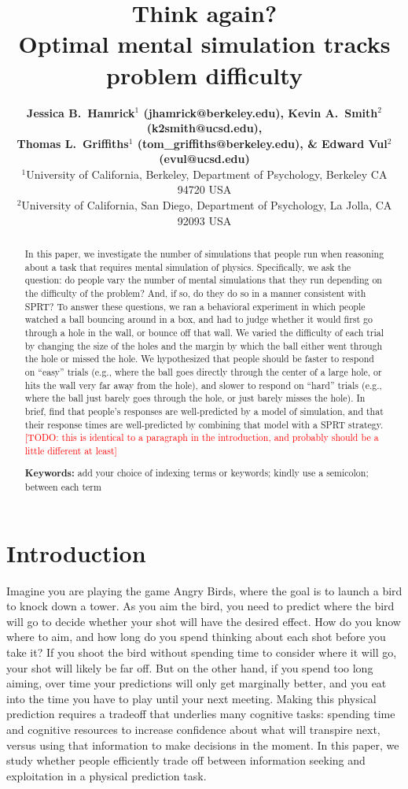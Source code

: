\documentclass[10pt,letterpaper]{article}
\title{Think again?\\ Optimal mental simulation tracks problem difficulty}
\author{{\large \bf Jessica B.~Hamrick$^1$ (jhamrick@berkeley.edu),
    Kevin A.~Smith$^2$ (k2smith@ucsd.edu),}\\
    {\large \bf Thomas L.~Griffiths$^1$ (tom\_griffiths@berkeley.edu),
      \& Edward Vul$^2$ (evul@ucsd.edu)}\\
    $^1$University of California, Berkeley, Department of Psychology, Berkeley CA 94720 USA\\
    $^2$University of California, San Diego, Department of Psychology, La Jolla, CA 92093 USA}
\newcommand{\TODO}[1]{\textcolor{red}{[TODO: #1]}}
\begin{document}
\maketitle

\begin{abstract}
In this paper, we investigate the number of simulations that people run when reasoning about a task that requires mental simulation of physics. 
Specifically, we ask the question: do people vary the number of mental simulations that they run depending on the difficulty of the problem? 
And, if so, do they do so in a manner consistent with SPRT? 
To answer these questions, we ran a behavioral experiment in which people watched a ball bouncing around in a box, and had to judge whether it would first go through a hole in the wall, or bounce off that wall. 
We varied the difficulty of each trial by changing the size of the holes and the margin by which the ball either went through the hole or missed the hole. 
We hypothesized that people should be faster to respond on ``easy'' trials (e.g., where the ball goes directly through the center of a large hole, or hits the wall very far away from the hole), and slower to respond on ``hard'' trials (e.g., where the ball just barely goes through the hole, or just barely misses the hole). 
In brief, find that people's responses are well-predicted by a model of simulation, and that their response times are well-predicted by combining that model with a SPRT strategy.
\TODO{this is identical to a paragraph in the introduction, and probably should be a little different at least}

\textbf{Keywords:} 
add your choice of indexing terms or keywords; kindly use a
semicolon; between each term
\end{abstract}

\section{Introduction}

Imagine you are playing the game Angry Birds, where the goal is to launch a bird to knock down a tower. 
As you aim the bird, you need to predict where the bird will go to decide whether your shot will have the desired effect. 
How do you know where to aim, and how long do you spend thinking about each shot before you take it? 
If you shoot the bird without spending time to consider where it will go, your shot will likely be far off. 
But on the other hand, if you spend too long aiming, over time your predictions will only get marginally better, and you eat into the time you have to play until your next meeting. 
Making this physical prediction requires a tradeoff that underlies many cognitive tasks: spending time and cognitive resources to increase confidence about what will transpire next, versus using that information to make decisions in the moment. 
In this paper, we study whether people efficiently trade off between information seeking and exploitation in a physical prediction task.
\end{document}
